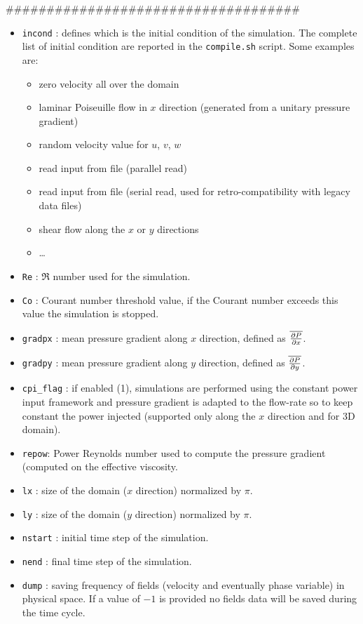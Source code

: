 \#\#\#\#\#\#\#\#\#\#\#\#\#\#\#\#\#\#\#\#\#\#\#\#\#\#\#\#\#\#\#\#\#\#\#\#
\begin{itemize}[label={$\circ$}]
\item \texttt{incond} : defines which is the initial condition of the simulation. The complete list of initial condition are reported in the \texttt{compile.sh} script. Some examples are:
\begin{itemize}
\item zero velocity all over the domain
\item laminar Poiseuille flow in $x$ direction (generated from a unitary pressure gradient)
\item random velocity value for $u$, $v$, $w$
\item read input from file (parallel read)
\item read input from file (serial read, used for retro-compatibility with legacy data files)
\item shear flow along the $x$ or $y$ directions
\item \dots
\end{itemize}
\item \texttt{Re} : $\Re$ number used for the simulation.
\item \texttt{Co} : Courant number threshold value, if the Courant number exceeds this value the simulation is stopped.
\item \texttt{gradpx} : mean pressure gradient along $x$ direction, defined as $\overline{\frac{\partial P}{\partial x}}$.
\item \texttt{gradpy} : mean pressure gradient along $y$ direction, defined as $\overline{\frac{\partial P}{\partial y}}$.
\item \texttt{cpi\_flag} : if enabled (1), simulations are performed using the constant power input framework and pressure gradient is adapted to the flow-rate so to keep constant the power injected (supported only along the $x$ direction and for 3D domain).
\item \texttt{repow}: Power Reynolds number used to compute the pressure gradient (computed on the effective viscosity.
\item \texttt{lx} : size of the domain ($x$ direction) normalized by $\pi$.
\item \texttt{ly} : size of the domain ($y$ direction) normalized by $\pi$.
\item \texttt{nstart} : initial time step of the simulation.
\item \texttt{nend} : final time step of the simulation.
\item \texttt{dump} : saving frequency of fields (velocity and eventually phase variable) in physical space. If a value of $-1$ is provided no fields data will be saved during the time cycle.

\end{itemize}
